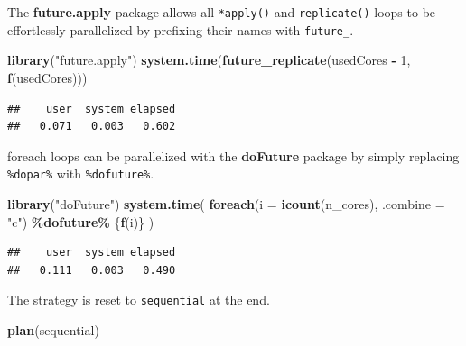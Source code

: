 \documentclass[
  12pt,
  american,
  a4paper,
  extrafontsizes,onecolumn,openright
  ]{memoir}
\newenvironment{Shaded}{\begin{snugshade}}{\end{snugshade}}
\newcommand{\AttributeTok}[1]{\textcolor[rgb]{0.13,0.29,0.53}{#1}}
\newcommand{\DecValTok}[1]{\textcolor[rgb]{0.00,0.00,0.81}{#1}}
\newcommand{\FunctionTok}[1]{\textcolor[rgb]{0.13,0.29,0.53}{\textbf{#1}}}
\newcommand{\NormalTok}[1]{#1}
\newcommand{\SpecialCharTok}[1]{\textcolor[rgb]{0.81,0.36,0.00}{\textbf{#1}}}
\newcommand{\StringTok}[1]{\textcolor[rgb]{0.31,0.60,0.02}{#1}}
\begin{document}
\normalsize

The \textbf{future.apply} package allows all \texttt{*apply()} and \texttt{replicate()} loops to be effortlessly parallelized by prefixing their names with \texttt{future\_}.

\scriptsize

\begin{Shaded}
\begin{Highlighting}[]
\FunctionTok{library}\NormalTok{(}\StringTok{"future.apply"}\NormalTok{)}
\FunctionTok{system.time}\NormalTok{(}\FunctionTok{future\_replicate}\NormalTok{(usedCores }\SpecialCharTok{{-}} \DecValTok{1}\NormalTok{, }\FunctionTok{f}\NormalTok{(usedCores)))}
\end{Highlighting}
\end{Shaded}

\begin{verbatim}
##    user  system elapsed 
##   0.071   0.003   0.602
\end{verbatim}

\normalsize

foreach loops can be parallelized with the \textbf{doFuture} package by simply replacing \texttt{\%dopar\%} with \texttt{\%dofuture\%}.

\scriptsize

\begin{Shaded}
\begin{Highlighting}[]
\FunctionTok{library}\NormalTok{(}\StringTok{"doFuture"}\NormalTok{)}
\FunctionTok{system.time}\NormalTok{(}
  \FunctionTok{foreach}\NormalTok{(}\AttributeTok{i =} \FunctionTok{icount}\NormalTok{(n\_cores), }\AttributeTok{.combine =} \StringTok{"c"}\NormalTok{) }\SpecialCharTok{\%dofuture\%}\NormalTok{ \{}\FunctionTok{f}\NormalTok{(i)\}}
\NormalTok{)}
\end{Highlighting}
\end{Shaded}

\begin{verbatim}
##    user  system elapsed 
##   0.111   0.003   0.490
\end{verbatim}

\normalsize

The strategy is reset to \texttt{sequential} at the end.

\scriptsize

\begin{Shaded}
\begin{Highlighting}[]
\FunctionTok{plan}\NormalTok{(sequential)}
\end{Highlighting}
\end{Shaded}
\end{document}
